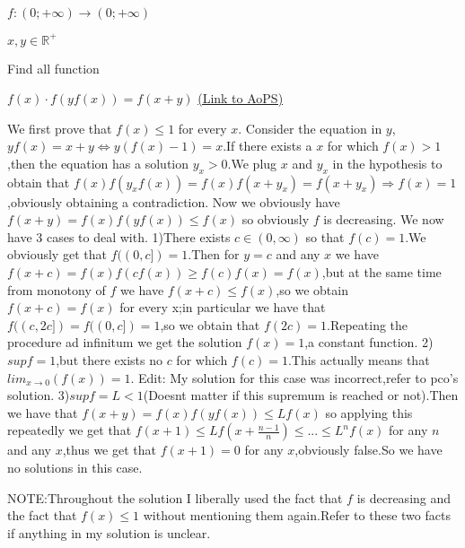 \begin{problem}
	$f: (0; + \infty) \rightarrow (0; + \infty)$

$ x,y\in\mathbb{R}^+ $

Find all function

$f(x) \cdot f(y  f(x))=f(x+y) $
	\flushright \href{https://artofproblemsolving.com/community/c6h616590}{(Link to AoPS)}
\end{problem}



\begin{solution}
	We first prove that $f(x) \le 1$ for every $x$.
Consider the equation in $y$, $yf(x)=x+y \Leftrightarrow y(f(x)-1)=x$.If there exists a $x$ for which $f(x)>1$,then the equation has a solution $y_{x}>0$.We plug $x$ and $y_{x}$ in the hypothesis to obtain that $f(x)f(y_{x}f(x))=f(x)f(x+y_{x})=f(x+y_{x}) \Rightarrow f(x)=1$,obviously obtaining a contradiction.
Now we obviously have $f(x+y)=f(x)f(yf(x)) \le f(x)$ so obviously $f$ is decreasing.
We now have 3 cases to deal with.
1)There exists $c \in (0,\infty)$ so that $f(c)=1$.We obviously get that $f((0,c])={1}$.Then for $y=c$ and any $x$ we have $f(x+c)=f(x)f(cf(x)) \ge f(c)f(x)=f(x)$,but at the same time from monotony of $f$ we have $f(x+c) \le f(x)$,so we obtain $f(x+c)=f(x)$ for every x;in particular we have that $f((c,2c])=f((0,c])={1}$,so we obtain that $f(2c)=1$.Repeating the procedure ad infinitum we get the solution $f(x)=1$,a constant function.
2)$sup f=1$,but there exists no $c$ for which $f(c)=1$.This actually means that $lim_{x \to 0}(f(x))=1$.
Edit: My solution for this case was incorrect,refer to pco's solution.
3)$sup f=L<1$(Doesnt matter if this supremum is reached or not).Then we have that $f(x+y)=f(x)f(yf(x)) \le Lf(x)$ so applying this repeatedly we get that $f(x+1) \le Lf(x+\frac{n-1}{n}) \le ... \le L^{n}f(x)$ for any $n$ and any $x$,thus we get that $f(x+1)=0$ for any $x$,obviously false.So we have no solutions in this case.


NOTE:Throughout the solution I liberally used the fact that $f$ is decreasing and the fact that $f(x) \le 1$ without mentioning them again.Refer to these two facts if anything in my solution is unclear.
\end{solution}




